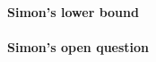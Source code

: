 \paragraph{Simon's lower bound}

\blindmathpaper

    



\paragraph{Simon's open question}

\blindmathpaper

    



